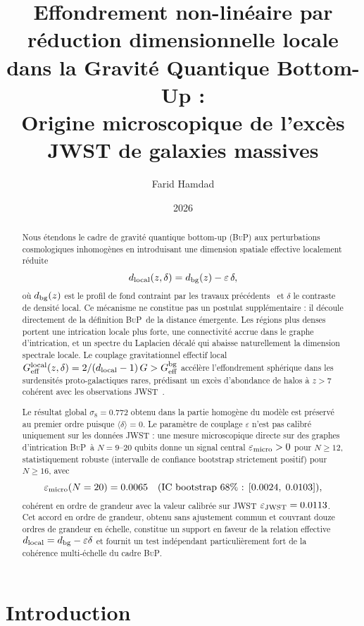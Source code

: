 \documentclass[11pt]{article}
\title{
  \textbf{Effondrement non-linéaire par réduction dimensionnelle locale\\
  dans la Gravité Quantique Bottom-Up :\\
  Origine microscopique de l'excès JWST de galaxies massives}
}
\author{Farid Hamdad}
\affil{
  Cadre Bottom-Up Quantum Gravity (\BuP)\\
  \small\url{https://github.com/Farid-Hamdad/Bottom-up-Quantum-Gravity}
}
\date{2026}
\newcommand{\Geff}{G_{\rm eff}}
\newcommand{\sig}{\sigma_8}
\newcommand{\BuP}{\textsc{BuP}}
\begin{document}
\maketitle

\begin{abstract}
Nous étendons le cadre de gravité quantique bottom-up (\BuP) aux perturbations cosmologiques inhomogènes en introduisant une dimension spatiale effective localement réduite
\[
d_{\rm local}(z,\delta) = d_{\rm bg}(z) - \varepsilon\,\delta,
\]
où $d_{\rm bg}(z)$ est le profil de fond contraint par les travaux précédents~\cite{hamdad2026bup} et $\delta$ le contraste de densité local.
Ce mécanisme ne constitue pas un postulat supplémentaire : il découle directement de la définition \BuP\ de la distance émergente.
Les régions plus denses portent une intrication locale plus forte, une connectivité accrue dans le graphe d'intrication, et un spectre du Laplacien décalé qui abaisse naturellement la dimension spectrale locale.
Le couplage gravitationnel effectif local
$\Geff^{\rm local}(z,\delta) = 2/(d_{\rm local}-1)\,G > \Geff^{\rm bg}$
accélère l'effondrement sphérique dans les surdensités proto-galactiques rares, prédisant un excès d'abondance de halos à $z>7$ cohérent avec les observations JWST~\cite{labbe2023,finkelstein2023}.

Le résultat global $\sig = 0.772$ obtenu dans la partie homogène du modèle est préservé au premier ordre puisque $\langle\delta\rangle = 0$.
Le paramètre de couplage $\varepsilon$ n'est pas calibré uniquement sur les données JWST : une mesure microscopique directe sur des graphes d'intrication \BuP\ à $N = 9$--$20$ qubits donne un signal central $\varepsilon_{\rm micro}>0$ pour $N\ge 12$, statistiquement robuste (intervalle de confiance bootstrap strictement positif) pour $N\ge 16$, avec
\[
\varepsilon_{\rm micro}(N=20) = 0.0065 \quad (\text{IC bootstrap 68\% : } [0.0024,\;0.0103]),
\]
cohérent en ordre de grandeur avec la valeur calibrée sur JWST $\varepsilon_{\rm JWST}=0.0113$.
Cet accord en ordre de grandeur, obtenu sans ajustement commun et couvrant douze ordres de grandeur en échelle, constitue un support en faveur de la relation effective $d_{\rm local}=d_{\rm bg}-\varepsilon\delta$ et fournit un test indépendant particulièrement fort de la cohérence multi-échelle du cadre \BuP.
\end{abstract}

\section{Introduction}
\end{document}
